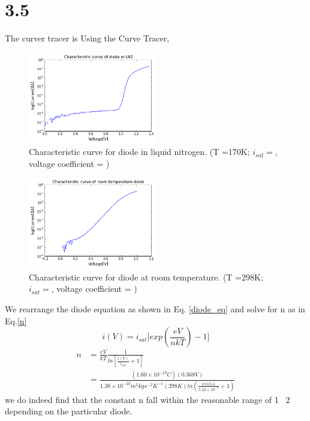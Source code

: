 \documentclass[authoryear, 12pt,5p, times]{elsarticle}
\begin{document}
\section*{3.5}

The curver tracer is  
Using the Curve Tracer, 
\begin{figure}[h!]
\center
\includegraphics[width=0.5\textwidth]{figure/3_5_ln2}
\caption{Characteristic curve for diode in liquid nitrogen. (T =170K; $i_{sat}=$, voltage coefficient = )}
\label{3_5_ln2}
\end{figure}
\begin{figure}[h!]
\center
\includegraphics[width=0.5\textwidth]{figure/3_5_norm}
\caption{Characteristic curve for diode at room temperature. (T =298K; $i_{sat}=$, voltage coefficient = ) }
\label{3_5_norm}
\end{figure}
\par We rearrange the diode equation as shown in Eq. \ref{diode_eq} and solve for n as in Eq.\ref{n}
\begin{equation}
i(V) = i_{sat}\Bigg[exp(\frac{eV}{nkT})-1\Bigg]
\label{diode_eq}
\end{equation}
\begin{equation}
\begin{split}
n &= \frac{eV}{kT}\frac{1}{ln[\frac{i(V)}{i_{sat}}+1]} \\&= \frac{(1.60\times10^{-19}C)(0.368V)}{1.38\times10^{-23}m^2kgs^{-2}K^{-1}(298K)ln(\frac{0.015A}{5.22\times10^{-7}}+1)}
\label{n}
\end{split}
\end{equation}
we do indeed find that the constant n fall within the reasonable range of 1~ 2  depending on the particular diode.
\end{document}
